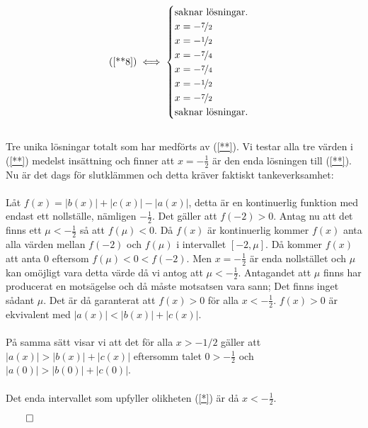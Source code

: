 \documentclass{article}
\begin{document}
\begin{gather*}
  \text{(\ref{**8})} \iff
  \begin{cases}
    \text{saknar lösningar.} \\
    x = - \nicefrac{7}{2} \\
    x = - \nicefrac{1}{2} \\
    x = - \nicefrac{7}{4} \\
    x = - \nicefrac{7}{4} \\
    x = - \nicefrac{1}{2} \\
    x = - \nicefrac{7}{2} \\
    \text{saknar lösningar.} \\
  \end{cases}
\end{gather*}
\\
Tre unika lösningar totalt som har medförts av (\ref{**}). Vi testar alla tre värden i (\ref{**}) medelst insättning och finner att $x = -\tfrac{1}{2}$ är den enda lösningen till (\ref{**}). Nu är det dags för slutklämmen och detta kräver faktiskt tankeverksamhet:
\\
\\
Låt $f(x) = |b(x)| + |c(x)| - |a(x)|$, detta är en kontinuerlig funktion med endast ett nollställe, nämligen $-\tfrac{1}{2}$. Det gäller att $f(-2) > 0$. Antag nu att det finns ett $\mu < -\tfrac{1}{2}$ så att $f(\mu) < 0$. Då $f(x)$ är kontinuerlig kommer $f(x)$ anta alla värden mellan $f(-2)$ och $f(\mu)$ i intervallet $\left[-2, \mu\right]$. Då kommer $f(x)$ att anta $0$ eftersom $f(\mu) < 0 < f(-2)$. Men $x = -\tfrac{1}{2}$ är enda nollstället och $\mu$ kan omöjligt vara detta värde då vi antog att $\mu < -\tfrac{1}{2}$. Antagandet att $\mu$ finns har producerat en motsägelse och då måste motsatsen vara sann; Det finns inget sådant $\mu$. Det är då garanterat att $f(x) > 0$ för alla $x < -\tfrac{1}{2}$. $f(x) > 0$ är ekvivalent med $|a(x)| < |b(x)| + |c(x)|$.
\\
\\På samma sätt visar vi att det för alla $x > -1/2$ gäller att $|a(x)| > |b(x)| + |c(x)|$ eftersomm talet $0 > -\tfrac{1}{2}$ och $|a(0)| > |b(0)| + |c(0)|$.
\\
\\
Det enda intervallet som upfyller olikheten (\ref{*}) är då $x < -\tfrac{1}{2}$.

\centerline{$\qed$}
\end{document}
